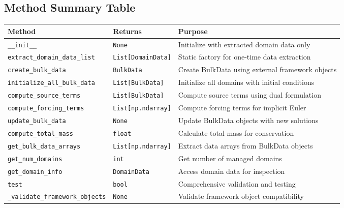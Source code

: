 \subsection{Method Summary Table}
\label{subsec:lean_method_summary}

\begin{longtable}{|p{5.3cm}|p{3.2cm}|p{5cm}|}
\hline
\textbf{Method} & \textbf{Returns} & \textbf{Purpose} \\
\hline
\endhead

\texttt{\_\_init\_\_} & \texttt{None} & Initialize with extracted domain data only \\
\hline

\texttt{extract\_domain\_data\_list} & \texttt{List[DomainData]} & Static factory for one-time data extraction \\
\hline

\texttt{create\_bulk\_data} & \texttt{BulkData} & Create BulkData using external framework objects \\
\hline

\texttt{initialize\_all\_bulk\_data} & \texttt{List[BulkData]} & Initialize all domains with initial conditions \\
\hline

\texttt{compute\_source\_terms} & \texttt{List[BulkData]} & Compute source terms using dual formulation \\
\hline

\texttt{compute\_forcing\_terms} & \texttt{List[np.ndarray]} & Compute forcing terms for implicit Euler \\
\hline

\texttt{update\_bulk\_data} & \texttt{None} & Update BulkData objects with new solutions \\
\hline

\texttt{compute\_total\_mass} & \texttt{float} & Calculate total mass for conservation \\
\hline

\texttt{get\_bulk\_data\_arrays} & \texttt{List[np.ndarray]} & Extract data arrays from BulkData objects \\
\hline

\texttt{get\_num\_domains} & \texttt{int} & Get number of managed domains \\
\hline

\texttt{get\_domain\_info} & \texttt{DomainData} & Access domain data for inspection \\
\hline

\texttt{test} & \texttt{bool} & Comprehensive validation and testing \\
\hline

\texttt{\_validate\_framework\_objects} & \texttt{None} & Validate framework object compatibility \\
\hline

\end{longtable}

